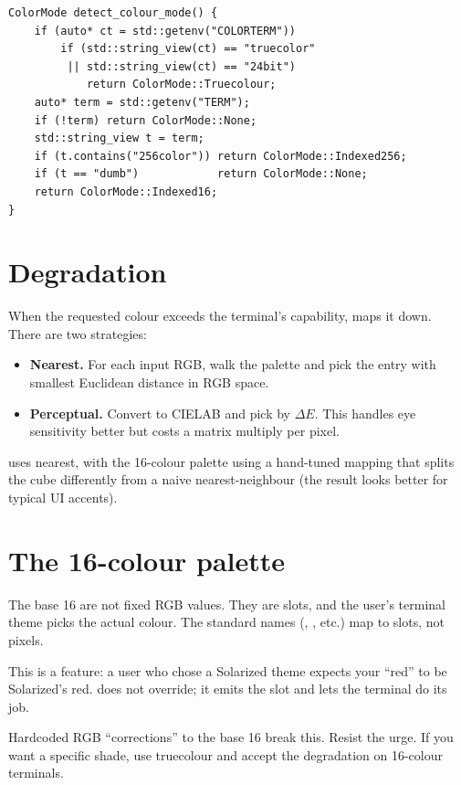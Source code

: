 \begin{lstlisting}
ColorMode detect_colour_mode() {
    if (auto* ct = std::getenv("COLORTERM"))
        if (std::string_view(ct) == "truecolor"
         || std::string_view(ct) == "24bit")
            return ColorMode::Truecolour;
    auto* term = std::getenv("TERM");
    if (!term) return ColorMode::None;
    std::string_view t = term;
    if (t.contains("256color")) return ColorMode::Indexed256;
    if (t == "dumb")            return ColorMode::None;
    return ColorMode::Indexed16;
}
\end{lstlisting}

\section{Degradation}

When the requested colour exceeds the terminal's capability,
\maya{} maps it down. There are two strategies:

\begin{itemize}[leftmargin=*]
  \item \textbf{Nearest.} For each input RGB, walk the palette
    and pick the entry with smallest Euclidean distance in RGB
    space.
  \item \textbf{Perceptual.} Convert to CIELAB and pick by
    $\Delta E$. This handles eye sensitivity better but costs a
    matrix multiply per pixel.
\end{itemize}

\maya{} uses nearest, with the 16-colour palette using a
hand-tuned mapping that splits the cube differently from a naive
nearest-neighbour (the result looks better for typical UI
accents).

\section{The 16-colour palette}

The base 16 are not fixed RGB values. They are slots, and the
user's terminal theme picks the actual colour. The standard names
(, , etc.) map to slots, not pixels.

This is a feature: a user who chose a Solarized theme expects
your ``red'' to be Solarized's red. \maya{} does not override; it
emits the slot and lets the terminal do its job.

\begin{warning}
Hardcoded RGB ``corrections'' to the base 16 break this. Resist
the urge. If you want a specific shade, use truecolour and
accept the degradation on 16-colour terminals.
\end{warning}

